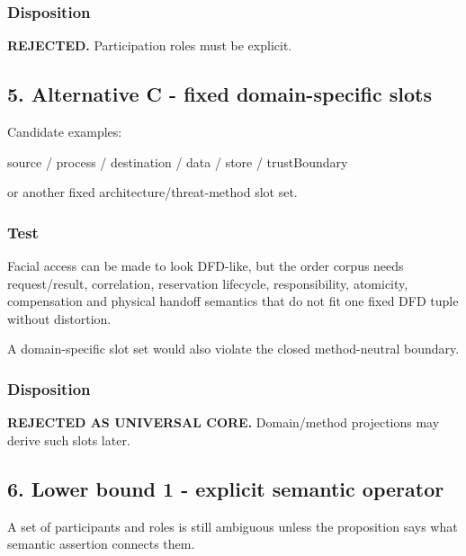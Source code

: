 \documentclass[
  10pt,
  letterpaper,
]{article}
\newenvironment{Shaded}{}{}
\newcommand{\NormalTok}[1]{#1}
\begin{document}
\subsubsection{Disposition}\label{disposition-1}

\textbf{REJECTED.} Participation roles must be explicit.

\subsection{5. Alternative C - fixed domain-specific
slots}\label{alternative-c---fixed-domain-specific-slots}

Candidate examples:

\begin{Shaded}
\begin{Highlighting}[]
\NormalTok{source / process / destination / data / store / trustBoundary}
\end{Highlighting}
\end{Shaded}

or another fixed architecture/threat-method slot set.

\subsubsection{Test}\label{test-2}

Facial access can be made to look DFD-like, but the order corpus needs
request/result, correlation, reservation lifecycle, responsibility,
atomicity, compensation and physical handoff semantics that do not fit
one fixed DFD tuple without distortion.

A domain-specific slot set would also violate the closed method-neutral
boundary.

\subsubsection{Disposition}\label{disposition-2}

\textbf{REJECTED AS UNIVERSAL CORE.} Domain/method projections may
derive such slots later.

\subsection{6. Lower bound 1 - explicit semantic
operator}\label{lower-bound-1---explicit-semantic-operator}

A set of participants and roles is still ambiguous unless the
proposition says what semantic assertion connects them.
\end{document}
